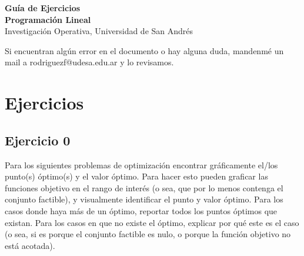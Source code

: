 \documentclass[12pt]{article}
\begin{document}
\begin{center}
    {\LARGE \textbf{Guía de Ejercicios \\Programación Lineal}}\\[0.5em]
    {Investigación Operativa, Universidad de San Andrés}
\end{center}

Si encuentran algún error en el documento o hay alguna duda, mandenmé un mail a rodriguezf@udesa.edu.ar y lo revisamos.

\section{Ejercicios}

\subsection*{Ejercicio 0}
Para los siguientes problemas de optimización encontrar gráficamente el/los punto(s) óptimo(s) y el valor óptimo. Para hacer esto pueden graficar las funciones objetivo en el rango de interés (o sea, que por lo menos contenga el conjunto factible), y visualmente identificar el punto y valor óptimo. Para los casos donde haya más de un óptimo, reportar todos los puntos óptimos que existan. Para los casos en que no existe el óptimo, explicar por qué este es el caso (o sea, si es porque el conjunto factible es nulo, o porque la función objetivo no está acotada).
\end{document}
